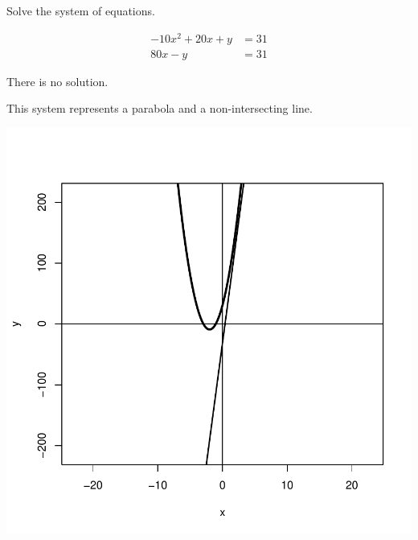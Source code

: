 
\begin{question}
Solve the system of equations.

\[\begin{aligned}
- 10 x^{2} + 20 x + y &= 31 \\
80 x - y &= 31
\end{aligned}\]
\end{question}

\begin{solution}
There is no solution.

This system represents a parabola and a non-intersecting line.

\includegraphics{unnamed-chunk-2-1-3.pdf}\\
\end{solution}

